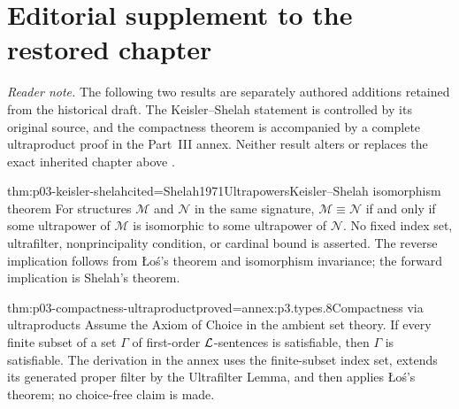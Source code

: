 \section*{Editorial supplement to the restored chapter}
\noindent\textit{Reader note.} The following two results are separately
authored additions retained from the historical draft.  The
Keisler--Shelah statement is controlled by its original source, and the
compactness theorem is accompanied by a complete ultraproduct proof in the
Part~III annex.  Neither result alters or replaces the exact inherited chapter
above \cite{Shelah1971Ultrapowers,ChangKeisler1990}.

\begin{hbtheorem}{thm:p03-keisler-shelah}{cited=Shelah1971Ultrapowers}{Keisler--Shelah isomorphism theorem}
For structures \(\mathcal M\) and \(\mathcal N\) in the same signature,
\(\mathcal M\equiv\mathcal N\) if and only if some ultrapower of
\(\mathcal M\) is isomorphic to some ultrapower of \(\mathcal N\).
No fixed index set, ultrafilter, nonprincipality condition, or cardinal bound
is asserted.  The reverse implication follows from \L o\'s's theorem and
isomorphism invariance; the forward implication is Shelah's theorem.
\end{hbtheorem}

\begin{hbtheorem}{thm:p03-compactness-ultraproduct}{proved=annex:p3.types.8}{Compactness via ultraproducts}
Assume the Axiom of Choice in the ambient set theory.  If every finite subset
of a set \(\Gamma\) of first-order \(\mathcal{L}\)-sentences is satisfiable, then
\(\Gamma\) is satisfiable.  The derivation in the annex uses the finite-subset
index set, extends its generated proper filter by the Ultrafilter Lemma, and
then applies \L o\'s's theorem; no choice-free claim is made.
\end{hbtheorem}
